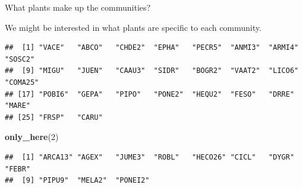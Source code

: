 \documentclass[
  ignorenonframetext,
]{beamer}
\newenvironment{Shaded}{\begin{snugshade}}{\end{snugshade}}
\newcommand{\ControlFlowTok}[1]{\textcolor[rgb]{0.13,0.29,0.53}{\textbf{#1}}}
\newcommand{\DecValTok}[1]{\textcolor[rgb]{0.00,0.00,0.81}{#1}}
\newcommand{\KeywordTok}[1]{\textcolor[rgb]{0.13,0.29,0.53}{\textbf{#1}}}
\newcommand{\NormalTok}[1]{#1}
\newcommand{\OperatorTok}[1]{\textcolor[rgb]{0.81,0.36,0.00}{\textbf{#1}}}
\newcommand{\StringTok}[1]{\textcolor[rgb]{0.31,0.60,0.02}{#1}}
\begin{document}
\begin{frame}[fragile]{What plants make up the communities?}
\protect\hypertarget{what-plants-make-up-the-communities}{}

We might be interested in what plants are specific to each community.
\scriptsize

\begin{Shaded}
\end{Shaded}

\begin{verbatim}
##  [1] "VACE"   "ABCO"   "CHDE2"  "EPHA"   "PECR5"  "ANMI3"  "ARMI4"  "SOSC2" 
##  [9] "MIGU"   "JUEN"   "CAAU3"  "SIDR"   "BOGR2"  "VAAT2"  "LICO6"  "COMA25"
## [17] "POBI6"  "GEPA"   "PIPO"   "PONE2"  "HEQU2"  "FESO"   "DRRE"   "MARE"  
## [25] "FRSP"   "CARU"
\end{verbatim}

\begin{Shaded}
\begin{Highlighting}[]
\KeywordTok{only_here}\NormalTok{(}\DecValTok{2}\NormalTok{)}
\end{Highlighting}
\end{Shaded}

\begin{verbatim}
##  [1] "ARCA13" "AGEX"   "JUME3"  "ROBL"   "HECO26" "CICL"   "DYGR"   "FEBR"  
##  [9] "PIPU9"  "MELA2"  "PONEI2"
\end{verbatim}

\end{frame}
\end{document}
